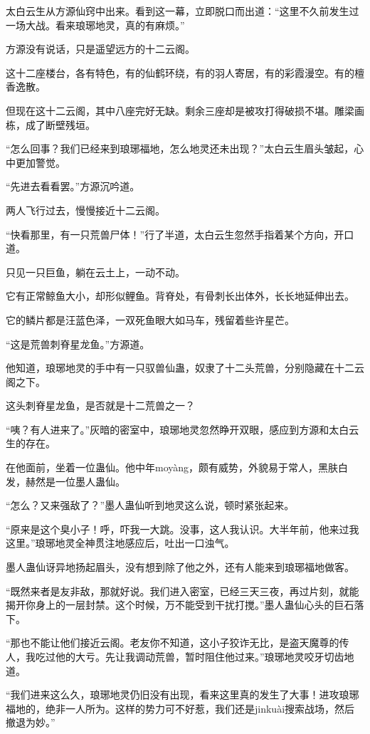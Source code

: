 \begin{this_body}
太白云生从方源仙窍中出来。看到这一幕，立即脱口而出道：“这里不久前发生过一场大战。看来琅琊地灵，真的有麻烦。”

方源没有说话，只是遥望远方的十二云阁。

这十二座楼台，各有特色，有的仙鹤环绕，有的羽人寄居，有的彩霞漫空。有的檀香逸散。

但现在这十二云阁，其中八座完好无缺。剩余三座却是被攻打得破损不堪。雕梁画栋，成了断壁残垣。

“怎么回事？我们已经来到琅琊福地，怎么地灵还未出现？”太白云生眉头皱起，心中更加警觉。

“先进去看看罢。”方源沉吟道。

两人飞行过去，慢慢接近十二云阁。

“快看那里，有一只荒兽尸体！”行了半道，太白云生忽然手指着某个方向，开口道。

只见一只巨鱼，躺在云土上，一动不动。

它有正常鲸鱼大小，却形似鲤鱼。背脊处，有骨刺长出体外，长长地延伸出去。

它的鳞片都是汪蓝色泽，一双死鱼眼大如马车，残留着些许星芒。

“这是荒兽刺脊星龙鱼。”方源道。

他知道，琅琊地灵的手中有一只驭兽仙蛊，奴隶了十二头荒兽，分别隐藏在十二云阁之下。

这头刺脊星龙鱼，是否就是十二荒兽之一？

“咦？有人进来了。”灰暗的密室中，琅琊地灵忽然睁开双眼，感应到方源和太白云生的存在。

在他面前，坐着一位蛊仙。他中年moyàng，颇有威势，外貌易于常人，黑肤白发，赫然是一位墨人蛊仙。

“怎么？又来强敌了？”墨人蛊仙听到地灵这么说，顿时紧张起来。

“原来是这个臭小子！呼，吓我一大跳。没事，这人我认识。大半年前，他来过我这里。”琅琊地灵全神贯注地感应后，吐出一口浊气。

墨人蛊仙讶异地扬起眉头，没有想到除了他之外，还有人能来到琅琊福地做客。

“既然来者是友非敌，那就好说。我们进入密室，已经三天三夜，再过片刻，就能揭开你身上的一层封禁。这个时候，万不能受到干扰打搅。”墨人蛊仙心头的巨石落下。

“那也不能让他们接近云阁。老友你不知道，这小子狡诈无比，是盗天魔尊的传人，我吃过他的大亏。先让我调动荒兽，暂时阻住他过来。”琅琊地灵咬牙切齿地道。

“我们进来这么久，琅琊地灵仍旧没有出现，看来这里真的发生了大事！进攻琅琊福地的，绝非一人所为。这样的势力可不好惹，我们还是jinkuài搜索战场，然后撤退为妙。”


\end{this_body}
